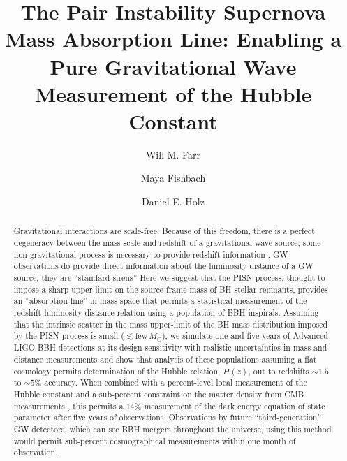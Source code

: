 \documentclass[modern]{aastex62}
\newcommand{\MSun}{M_\odot}
\begin{document}
\title{The Pair Instability Supernova Mass Absorption Line: Enabling a Pure
Gravitational Wave Measurement of the Hubble Constant}

\author[0000-0003-1540-8562]{Will M. Farr}

\author[0000-0002-1980-5293]{Maya Fishbach}

\author[0000-0002-0175-5064]{Daniel E. Holz}

\begin{abstract}
%
  Gravitational interactions are scale-free.  Because of this freedom, there is
  a perfect degeneracy between the mass scale and redshift of a gravitational
  wave source; some non-gravitational process is necessary to provide redshift
  information \citep{Taylor2012,Messenger2012}. \Ac{GW} observations do provide
  direct information about the luminosity distance of a \ac{GW} source; they are
  ``standard sirens'' \citep{Schutz1986,Holz2005}  Here we suggest that the
  \ac{PISN} process, thought to impose a sharp upper-limit on the source-frame
  mass of \ac{BH} stellar remnants, provides an ``absorption line'' in mass
  space that permits a statistical measurement of the
  redshift-luminosity-distance relation using a population of \ac{BBH}
  inspirals.  Assuming that the intrinsic scatter in the mass upper-limit of the
  \ac{BH} mass distribution imposed by the \ac{PISN} process is small ($\lesssim
  \mathrm{few}\,\MSun$), we simulate one and five years of Advanced LIGO
  \ac{BBH} detections at its design sensitivity with realistic uncertainties in
  mass and distance measurements and show that analysis of these populations
  assuming a flat cosmology permits determination of the Hubble relation,
  $H(z)$, out to redshifts $\sim 1.5$ to $\sim 5\%$ accuracy.  When combined
  with a percent-level local measurement of the Hubble constant \citep{Chen2017}
  and a sub-percent constraint on the matter density from CMB measurements
  \citep{Planck2016}, this permits a $14\%$ measurement of the dark energy
  equation of state parameter after five years of observations. Observations by
  future ``third-generation'' \ac{GW} detectors, which can see \ac{BBH} mergers
  throughout the universe, using this method would permit sub-percent
  cosmographical measurements within one month of observation.
%
\end{abstract}
\end{document}
